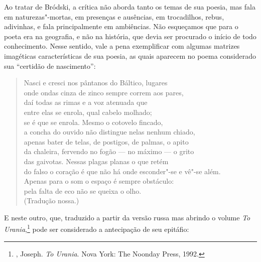 Ao tratar de Bródski, a crítica não aborda tanto os temas de sua poesia, mas
fala em naturezas"-mortas, em presenças e ausências, em trocadilhos, rebus, adivinhas, e fala
principalmente em ambiências. Não esqueçamos que para o poeta era na
geografia, e não na história, que devia ser procurado o início de todo
conhecimento. Nesse sentido, vale a pena exemplificar com algumas
matrizes imagéticas características de sua poesia, as quais aparecem no poema
considerado sua ``certidão de nascimento'':

\begin{verse}
Nasci e cresci nos pântanos do Báltico, lugares \\
onde ondas cinza de zinco sempre correm \qb{}aos pares, \\
daí todas as rimas e a voz atenuada que \\
entre elas se enrola, qual cabelo molhado; \\
se é que se enrola. Mesmo o cotovelo \qb{}fincado, \\
a concha do ouvido não distingue nelas \qb{}nenhum chiado, \\
apenas bater de telas, de postigos, \qb{}de palmas, o apito \\
da chaleira, fervendo no fogão --- no máximo \qb{}--- o grito \\
das gaivotas. Nessas plagas planas o que \qb{}retém \\
do falso o coração é que não há onde \qb{}esconder"-se e vê"-se além. \\
Apenas para o som o espaço é sempre \qb{}obstáculo: \\
pela falta de eco não se queixa o olho.\\
(Tradução nossa.)
\end{verse}

E neste outro, que, traduzido a partir da versão russa mas abrindo o 
volume \emph{To Urania},\footnote{, Joseph. 
\emph{To Urania}. Nova York: The Noonday Press, 1992.} pode ser
 considerado a antecipação de seu epitáfio:


